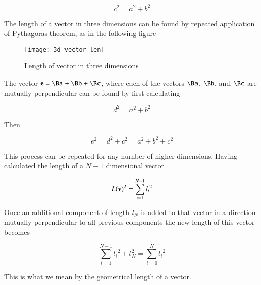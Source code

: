 \[
c^2 = a^2 + b^2
\]


The length of a vector in three dimensions can be found by repeated application of Pythagoras theorem, as in the following figure 

\begin{figure}[htp]
\centering
\texttt{[image: 3d\_vector\_len]}
\caption{Length of vector in three dimensions}\label{fig:3dveclen}
\end{figure}

The vector $\Be = \Ba + \Bb + \Bc$, where each of the vectors $\Ba$, $\Bb$, and $\Bc$ are mutually perpendicular can be found by first calculating

\[
d^2 = a^2 + b^2
\]

Then

\[
e^2 = d^2 + c^2 = a^2 + b^2 + c^2
\]

This process can be repeated for any number of higher dimensions.  Having calculated the length of a $N-1$ dimensional vector

\[
{L(\mathbf{v})}^2 = \sum_{i=1}^{N-1} {{l_i}^2}
\]

Once an additional component of length $l_N$ is added to that vector in a direction mutually perpendicular to all previous components the new length of this vector becomes

\[
\sum_{i=1}^{N-1} {{l_i}^2} + l_N^2 = \sum_{i=0}^{N} {{l_i}^2}
\]

This is what we mean by the geometrical length of a vector.

%
%

